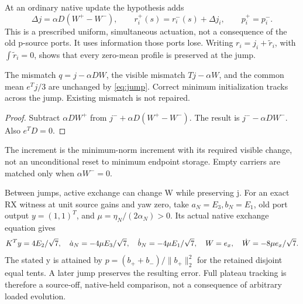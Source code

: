 At an ordinary native update the hypothesis adds
\begin{equation}\label{eq:jump}
\Delta j=\alpha D(W^+-W^-),\qquad
r_i^+(s)=r_i^-(s)+\Delta j_i,\qquad p_i^+=p_i^- .
\end{equation}
This is a prescribed uniform, simultaneous actuation, not a consequence of the old p-source ports. It uses information those ports lose. Writing \(r_i=j_i+\widetilde r_i\), with \(\int\widetilde r_i=0\), shows that every zero-mean profile is preserved at the jump.

\begin{proposition}\label{prop:tracking}
The mismatch \(q=j-\alpha DW\), the visible mismatch \(Tj-\alpha W\), and the common mean \(e^Tj/3\) are unchanged by \eqref{eq:jump}. Correct minimum initialization tracks across the jump. Existing mismatch is not repaired.
\end{proposition}
\begin{proof}
Subtract \(\alpha DW^+\) from \(j^-+\alpha D(W^+-W^-)\). The result is \(j^--\alpha DW^-\). Also \(e^TD=0\).
\end{proof}
The increment is the minimum-norm increment with its required visible change, not an unconditional reset to minimum endpoint storage. Empty carriers are matched only when \(\alpha W^-=0\).

Between jumps, active exchange can change W while preserving j. For an exact RX witness at unit source gains and yaw zero, take \(a_N=E_3,b_N=E_1\), old port output \(y=(1,1)^T\), and \(\mu=\eta_N/(2\alpha_N)>0\). Its actual native exchange equation gives
\begin{equation}\label{eq:interjump}
K^Ty=4E_2/\sqrt7,\quad
\dot a_N=-4\mu E_3/\sqrt7,\quad
\dot b_N=-4\mu E_1/\sqrt7,\quad
W=e_x,\quad \dot W=-8\mu e_x/\sqrt7.
\end{equation}
The stated y is attained by \(p=(b_++b_-)/\|b_+\|_2^2\) for the retained disjoint equal tents. A later jump preserves the resulting error. Full plateau tracking is therefore a source-off, native-held comparison, not a consequence of arbitrary loaded evolution.

